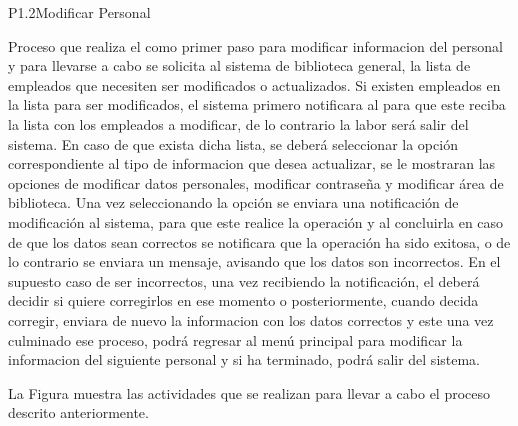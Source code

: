 




\begin{Proceso}{P1.2}{Modificar Personal} {
  
Proceso que realiza el  como primer paso para modificar informacion del personal y para llevarse a cabo se solicita al sistema de biblioteca general, la lista de empleados que necesiten ser modificados o actualizados.
Si existen empleados en la lista para ser modificados, el sistema primero notificara al  para que este reciba la lista con los empleados a modificar, de lo contrario la labor será salir del sistema. En caso de que exista dicha lista, se deberá seleccionar la opción correspondiente al tipo de informacion que desea actualizar, se le mostraran las opciones de modificar datos personales, modificar contraseña y modificar área de biblioteca.
Una vez seleccionando la opción se enviara una notificación de modificación al sistema, para que
este realice la operación y al concluirla en caso de que los datos sean correctos se notificara que la
operación ha sido exitosa, o de lo contrario se enviara un mensaje, avisando que los datos son
incorrectos.
En el supuesto caso de ser incorrectos, una vez recibiendo la notificación, el  deberá decidir si quiere corregirlos en ese momento o posteriormente, cuando decida corregir, enviara de nuevo la informacion con los datos correctos y este una vez culminado ese proceso, podrá regresar al menú principal para modificar la informacion del siguiente personal y si ha terminado, podrá salir del sistema.



  \noindent La Figura  muestra las actividades que se realizan para llevar a cabo el proceso descrito anteriormente.

}
\end{Proceso}
